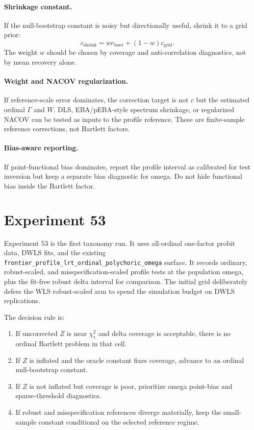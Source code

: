 \documentclass[11pt]{article}
\theoremstyle{plain}
\theoremstyle{remark}
\begin{document}
\paragraph{Shrinkage constant.}
If the null-bootstrap constant is noisy but directionally useful, shrink it to a
grid prior:
\[
  c_{\mathrm{shrink}} = w c_{\mathrm{boot}} + (1-w)c_{\mathrm{grid}}.
\]
The weight $w$ should be chosen by coverage and anti-correlation diagnostics, not
by mean recovery alone.

\paragraph{Weight and NACOV regularization.}
If reference-scale error dominates, the correction target is not $c$ but the
estimated ordinal $\Gamma$ and $W$. DLS, EBA/pEBA-style spectrum shrinkage, or
regularized NACOV can be tested as inputs to the profile reference. These are
finite-sample reference corrections, not Bartlett factors.

\paragraph{Bias-aware reporting.}
If point-functional bias dominates, report the profile interval as calibrated for
test inversion but keep a separate bias diagnostic for omega. Do not hide
functional bias inside the Bartlett factor.

\section{Experiment 53}

Experiment 53 is the first taxonomy run. It uses all-ordinal one-factor probit
data, DWLS fits, and the existing
\texttt{frontier\_profile\_lrt\_ordinal\_polychoric\_omega} surface. It records
ordinary, robust-scaled, and misspecification-scaled profile tests at the
population omega, plus the fit-free robust delta interval for comparison. The
initial grid deliberately defers the WLS robust-scaled arm to spend the
simulation budget on DWLS replications.

The decision rule is:
\begin{enumerate}
\item If uncorrected $Z$ is near $\chi^2_1$ and delta coverage is acceptable,
there is no ordinal Bartlett problem in that cell.
\item If $Z$ is inflated and the oracle constant fixes coverage, advance to an
ordinal null-bootstrap constant.
\item If $Z$ is not inflated but coverage is poor, prioritize omega point-bias
and sparse-threshold diagnostics.
\item If robust and misspecification references diverge materially, keep the
small-sample constant conditional on the selected reference regime.
\end{enumerate}
\end{document}

